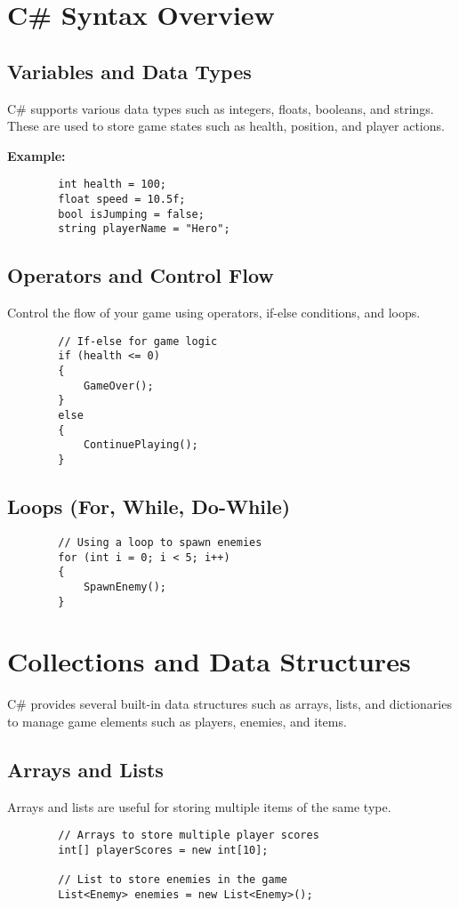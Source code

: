 \documentclass[a4paper,12pt]{book}
\begin{document}
	\section{C\# Syntax Overview}
	\subsection{Variables and Data Types}
	C\# supports various data types such as integers, floats, booleans, and strings. These are used to store game states such as health, position, and player actions.
	
	\textbf{Example:}
	\begin{lstlisting}
		int health = 100;
		float speed = 10.5f;
		bool isJumping = false;
		string playerName = "Hero";
	\end{lstlisting}
	
	\subsection{Operators and Control Flow}
	Control the flow of your game using operators, if-else conditions, and loops.
	
	\begin{lstlisting}
		// If-else for game logic
		if (health <= 0)
		{
			GameOver();
		}
		else
		{
			ContinuePlaying();
		}
	\end{lstlisting}
	
	\subsection{Loops (For, While, Do-While)}
	\begin{lstlisting}
		// Using a loop to spawn enemies
		for (int i = 0; i < 5; i++)
		{
			SpawnEnemy();
		}
	\end{lstlisting}
	
	\section{Collections and Data Structures}
	C\# provides several built-in data structures such as arrays, lists, and dictionaries to manage game elements such as players, enemies, and items.
	\subsection{Arrays and Lists}
	Arrays and lists are useful for storing multiple items of the same type.
	
	\begin{lstlisting}
		// Arrays to store multiple player scores
		int[] playerScores = new int[10];
		
		// List to store enemies in the game
		List<Enemy> enemies = new List<Enemy>();
	\end{lstlisting}
	
\end{document}
